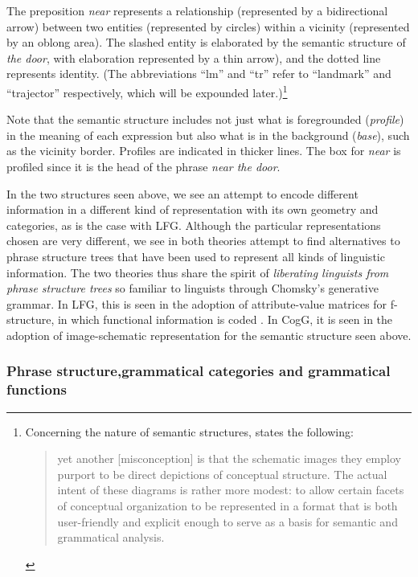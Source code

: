 \documentclass[output=paper,japanesefont,hidelinks]{langscibook}
\begin{document}
\largerpage[-2]
The preposition \textit{near} represents a relationship (represented by a bidirectional arrow) between two entities (represented by circles) within a vicinity (represented by an oblong area). The slashed entity is elaborated by the semantic structure of \textit{the door}, with elaboration represented by a thin arrow), and the dotted line represents identity. (The abbreviations ``lm'' and ``tr'' refer to ``landmark'' and ``trajector'' respectively, which will be expounded later.)\footnote{\textsuperscript{} Concerning the nature of semantic structures, \citet[12]{Langacker2008} states the following:
\begin{quote} yet another [misconception] is that the schematic images they employ purport to be direct depictions of conceptual structure. The actual intent of these diagrams is rather more modest: to allow certain facets of conceptual organization to be represented in a format that is both user-friendly and explicit enough to serve as a basis for semantic and grammatical analysis.\end{quote}}

Note that the semantic structure includes not just what is foregrounded (\textit{profile}) in the meaning of each expression but also what is in the background (\textit{base}), such as the vicinity border. Profiles are indicated in thicker lines. The box for \textit{near} is profiled since it is the head of the phrase \textit{near the door}.

In the two structures seen above, we see an attempt to encode different information in a different kind of representation with its own geometry and categories, as is the case with LFG. Although the particular representations chosen are very different, we see in both theories attempt to find alternatives to phrase structure trees that have been used to represent all kinds of linguistic information. The two theories thus share the spirit of \textit{liberating linguists from phrase structure trees} so familiar to linguists through Chomsky's generative grammar. In LFG, this is seen in the adoption of attribute-value matrices for f-structure, in which functional information is coded \citep{kaplanbresnan82}. In CogG, it is seen in the adoption of image-schematic representation for the semantic structure seen above.

\subsubsection{Phrase structure,grammatical categories and grammatical
  functions}
\label{sec:cg:3.2.2}
\end{document}
